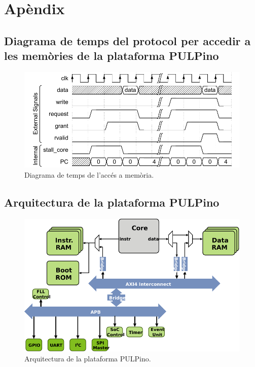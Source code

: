 \documentclass[10pt,a4paper,twocolumn,twoside]{article}
\begin{document}







\newpage

\appendix

\section*{Apèndix}

\setcounter{section}{1}

    \subsection{Diagrama de temps del protocol per accedir a les memòries de la plataforma PULPino}
    \label{app:PULPtime}
    \begin{figure}[!ht]
    \centering
    	\includegraphics[width=\linewidth]{pdf/Stall_PC.pdf}
        \caption{Diagrama de temps de l'accés a memòria.}
        \label{fig:PULP_Temp}
    \end{figure}
    
        \subsection{Arquitectura de la plataforma PULPino}
        \label{app:PULParch}
    \begin{figure}[!ht]
    \centering
    	\includegraphics[width=\linewidth]{pdf/Pulp_complete.pdf}
        \caption{Arquitectura de la plataforma PULPino. }
        \label{fig:PULParch}
    \end{figure}
    
\end{document}
